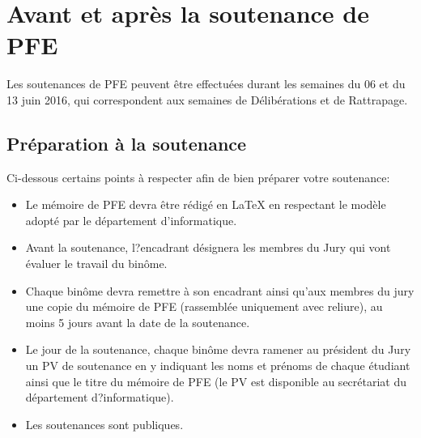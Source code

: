 \chapter{Avant et après la soutenance de PFE}

Les soutenances de PFE peuvent être effectuées durant les semaines du 06 et du 13 juin 2016, qui correspondent aux semaines de Délibérations et de Rattrapage.

\section{Préparation à la soutenance} 
Ci-dessous certains points à respecter afin de bien préparer votre soutenance:\\

\begin{itemize}
	\item Le mémoire de PFE devra être rédigé en LaTeX en respectant le modèle adopté par le département d'informatique.\\
	
	\item Avant la soutenance, l?encadrant désignera les membres du Jury qui vont évaluer le travail du binôme.
	
	\item Chaque binôme devra remettre à son encadrant ainsi qu'aux  membres du jury une copie du mémoire de PFE (rassemblée uniquement avec reliure), au moins 5 jours avant la date de la soutenance.
	
	\item	Le jour de la soutenance, chaque binôme devra ramener au président du Jury un PV de soutenance en y indiquant les noms et prénoms de chaque étudiant ainsi que le titre du mémoire de PFE (le PV est disponible au secrétariat du département d?informatique).
	
	\item	Les soutenances sont publiques.
\end{itemize}



